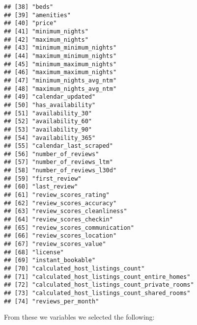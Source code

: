 \begin{verbatim}
## [38] "beds"                                        
## [39] "amenities"                                   
## [40] "price"                                       
## [41] "minimum_nights"                              
## [42] "maximum_nights"                              
## [43] "minimum_minimum_nights"                      
## [44] "maximum_minimum_nights"                      
## [45] "minimum_maximum_nights"                      
## [46] "maximum_maximum_nights"                      
## [47] "minimum_nights_avg_ntm"                      
## [48] "maximum_nights_avg_ntm"                      
## [49] "calendar_updated"                            
## [50] "has_availability"                            
## [51] "availability_30"                             
## [52] "availability_60"                             
## [53] "availability_90"                             
## [54] "availability_365"                            
## [55] "calendar_last_scraped"                       
## [56] "number_of_reviews"                           
## [57] "number_of_reviews_ltm"                       
## [58] "number_of_reviews_l30d"                      
## [59] "first_review"                                
## [60] "last_review"                                 
## [61] "review_scores_rating"                        
## [62] "review_scores_accuracy"                      
## [63] "review_scores_cleanliness"                   
## [64] "review_scores_checkin"                       
## [65] "review_scores_communication"                 
## [66] "review_scores_location"                      
## [67] "review_scores_value"                         
## [68] "license"                                     
## [69] "instant_bookable"                            
## [70] "calculated_host_listings_count"              
## [71] "calculated_host_listings_count_entire_homes" 
## [72] "calculated_host_listings_count_private_rooms"
## [73] "calculated_host_listings_count_shared_rooms" 
## [74] "reviews_per_month"
\end{verbatim}

From these we variables we selected the following:

